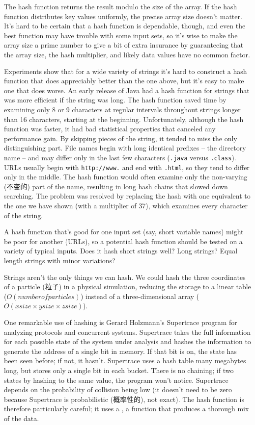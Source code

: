 The hash function returns the result modulo the size of the array. If the
hash function distributes key values uniformly, the precise array size
doesn't matter. It's hard to be certain that a hash function is dependable,
though, and even the best function may have trouble with some input sets,
so it's wise to make the array size a prime number to give a bit of extra
insurance by guaranteeing that the array size, the hash multiplier, and
likely data values have no common factor.

Experiments show that for a wide variety of strings it's hard to construct
a hash function that does appreciably better than the one above, but it's
easy to make one  that does worse. An early release of Java had a hash
function for strings that was more efficient if the string was long. The
hash function saved time by examining only 8 or 9 characters at regular
intervals throughout strings longer than 16 characters, starting at the
beginning. Unfortunately, although the hash function was faster, it had bad
statistical properties that canceled any performance gain. By skipping
pieces of the string, it tended to miss the only distinguishing part. File
names begin with long identical prefixes -- the directory name -- and may
differ only in the last few characters (\texttt{.java} versus
\texttt{.class}). URLs usually begin with \texttt{http://www.} and end with
\texttt{.html}, so they tend to differ only in the middle. The hash
function would often examine only the non-varying (不变的) part of the
name, resulting in long hash chains that slowed down searching. The problem
was resolved by replacing the hash with one equivalent to the one we have
shown (with a multiplier of 37), which examines every character of the
string.

A hash function that's good for one input set (say, short variable names)
might be poor for another (URLs), so a potential hash function should be
tested on a variety of typical inputs. Does it hash short strings well?
Long strings? Equal length strings with minor variations?

Strings aren't the only things we can hash. We could hash the three
coordinates of a particle (粒子) in a physical simulation, reducing the
storage to a linear table ($O(number of particles)$) instead of a
three-dimensional array ($O(xsize \times ysize \times zsize)$).

One remarkable use of hashing is Gerard Holzmann's Supertrace program for
analyzing protocols and concurrent systems. Supertrace takes the full
information for each possible state of the system under analysis and hashes
the information to generate the address of a single bit in memory. If that
bit is on, the state has been seen before; if not, it hasn't. Supertrace
uses a hash table many megabytes long, but stores only a single bit in each
bucket. There is no chaining; if two states  by hashing to
the same value, the program won't notice. Supertrace depends on the
probability of collision being low (it doesn't need to be zero because
Supertrace is probabilistic (概率性的), not exact). The hash function is
therefore particularly careful; it uses a , a
function that produces a thorough mix of the data.

